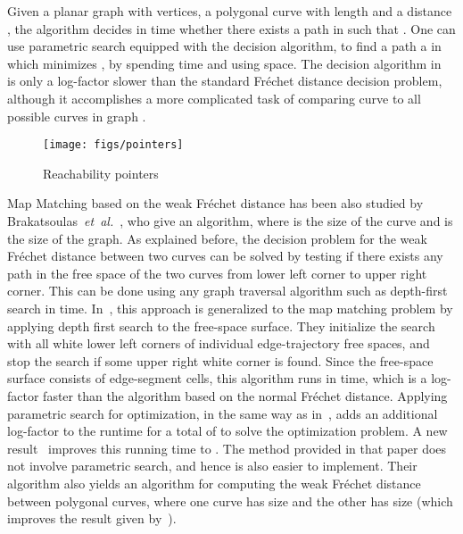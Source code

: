 \documentclass[12pt]{dalthesis}
\newcommand{\etal}{{\em et~al.\/}}
\newcommand{\Frechet}{Fr\'echet }
\begin{document}
Given a planar graph  with  vertices, 
a polygonal curve  
with length  and a distance , 
the algorithm decides in  time whether there exists a path
 in  such that  
 . 
One can  use  parametric search equipped with the decision algorithm, 
to find a path a  in  which minimizes , 
by spending   time and using  space.
The decision algorithm in~\cite{AltERW03a}
is only a log-factor slower than the standard \Frechet distance decision problem, although 
it accomplishes a  more complicated task of comparing curve 
to all possible curves in graph .


\begin{figure}[t]
	\centering
	\texttt{[image: figs/pointers]}
	\caption{Reachability pointers}
	\label{fig:pointers}
\end{figure}


Map Matching based on the weak \Frechet distance has been also studied
by Brakatsoulas~\etal~\cite{VehicleTracking}, who give an  algorithm, where  is the size of the curve and  is the size of the graph. 
As explained before, the decision problem for the weak \Frechet distance
between two curves can be solved by testing if there
exists any path in the free space of the two curves from
lower left corner to upper right corner. This
can be done using any graph traversal algorithm such
as depth-first search in  time.
In~\cite{VehicleTracking}, this approach 
is generalized to the map matching
problem by applying depth first search to
the free-space surface. They initialize the search with all
white lower left corners of individual edge-trajectory
free spaces, and stop the search if some upper
right white corner is found. Since the free-space surface
consists of  edge-segment cells, this algorithm runs
in  time, which is a log-factor faster than the
algorithm based on the normal \Frechet distance. Applying
parametric search for optimization, in the same way as
in~\cite{AltG95}, adds an additional log-factor to the runtime
for a total of  to solve the optimization
problem. A new result~\cite{fasterMM-Weak1}
improves this running time to . The method provided in that 
paper does not involve parametric search, 
and hence is also easier to implement. 
 Their algorithm also yields an  algorithm for computing 
 the weak \Frechet distance between polygonal curves, 
 where one curve has size  and the other has size  (which
improves the  result given by~\cite{AltG95}).
\end{document}
